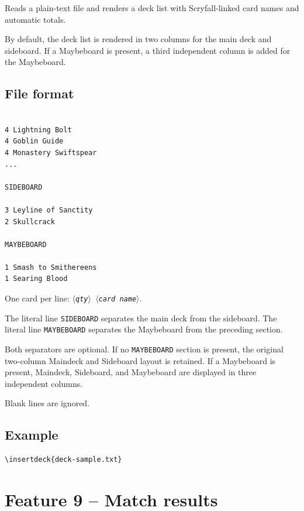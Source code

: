 \documentclass[a4paper,11pt]{article}
\newcommand{\meta}[1]{\textnormal{\textit{$\langle$#1$\rangle$}}}
\begin{document}
Reads a plain-text file and renders a deck list with
Scryfall-linked card names and automatic totals.

By default, the deck list is rendered in two columns for the
main deck and sideboard. If a Maybeboard is present, a third
independent column is added for the Maybeboard.

\subsection{File format}

\begin{lstlisting}[language={},basicstyle=\ttfamily\small]

4 Lightning Bolt
4 Goblin Guide
4 Monastery Swiftspear
...

SIDEBOARD

3 Leyline of Sanctity
2 Skullcrack

MAYBEBOARD

1 Smash to Smithereens
1 Searing Blood

\end{lstlisting}

One card per line: \texttt{\meta{qty}~\meta{card name}}.

The literal line \texttt{SIDEBOARD} separates the main deck
from the sideboard. The literal line \texttt{MAYBEBOARD}
separates the Maybeboard from the preceding section.

Both separators are optional. If no \texttt{MAYBEBOARD}
section is present, the original two-column Maindeck and
Sideboard layout is retained. If a Maybeboard is present,
Maindeck, Sideboard, and Maybeboard are displayed in three
independent columns.

Blank lines are ignored.

\subsection{Example}

\begin{lstlisting}
\insertdeck{deck-sample.txt}
\end{lstlisting}


\section{Feature 9 -- Match results}
\end{document}
